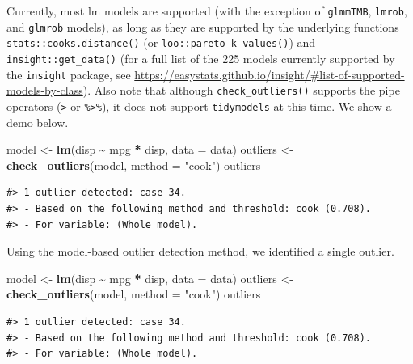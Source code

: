 \documentclass{article}
\newenvironment{Shaded}{\begin{snugshade}}{\end{snugshade}}
\newcommand{\AttributeTok}[1]{\textcolor[rgb]{0.13,0.29,0.53}{#1}}
\newcommand{\FunctionTok}[1]{\textcolor[rgb]{0.13,0.29,0.53}{\textbf{#1}}}
\newcommand{\NormalTok}[1]{#1}
\newcommand{\OtherTok}[1]{\textcolor[rgb]{0.56,0.35,0.01}{#1}}
\newcommand{\SpecialCharTok}[1]{\textcolor[rgb]{0.81,0.36,0.00}{\textbf{#1}}}
\newcommand{\StringTok}[1]{\textcolor[rgb]{0.31,0.60,0.02}{#1}}
\begin{document}
Currently, most lm models are supported (with the exception of
\texttt{glmmTMB}, \texttt{lmrob}, and \texttt{glmrob} models), as long
as they are supported by the underlying functions
\texttt{stats::cooks.distance()} (or \texttt{loo::pareto\_k\_values()})
and \texttt{insight::get\_data()} (for a full list of the 225 models
currently supported by the \texttt{insight} package, see
\url{https://easystats.github.io/insight/\#list-of-supported-models-by-class}).
Also note that although \texttt{check\_outliers()} supports the pipe
operators (\texttt{\textbar{}\textgreater{}} or
\texttt{\%\textgreater{}\%}), it does not support \texttt{tidymodels} at
this time. We show a demo below.

\begin{Shaded}
\begin{Highlighting}[]
\NormalTok{model }\OtherTok{\textless{}{-}} \FunctionTok{lm}\NormalTok{(disp }\SpecialCharTok{\textasciitilde{}}\NormalTok{ mpg }\SpecialCharTok{*}\NormalTok{ disp, }\AttributeTok{data =}\NormalTok{ data)}
\NormalTok{outliers }\OtherTok{\textless{}{-}} \FunctionTok{check\_outliers}\NormalTok{(model, }\AttributeTok{method =} \StringTok{"cook"}\NormalTok{)}
\NormalTok{outliers}
\end{Highlighting}
\end{Shaded}

\begin{verbatim}
#> 1 outlier detected: case 34.
#> - Based on the following method and threshold: cook (0.708).
#> - For variable: (Whole model).
\end{verbatim}

Using the model-based outlier detection method, we identified a single
outlier.

\begin{Shaded}
\begin{Highlighting}[]
\NormalTok{model }\OtherTok{\textless{}{-}} \FunctionTok{lm}\NormalTok{(disp }\SpecialCharTok{\textasciitilde{}}\NormalTok{ mpg }\SpecialCharTok{*}\NormalTok{ disp, }\AttributeTok{data =}\NormalTok{ data)}
\NormalTok{outliers }\OtherTok{\textless{}{-}} \FunctionTok{check\_outliers}\NormalTok{(model, }\AttributeTok{method =} \StringTok{"cook"}\NormalTok{)}
\NormalTok{outliers}
\end{Highlighting}
\end{Shaded}

\begin{verbatim}
#> 1 outlier detected: case 34.
#> - Based on the following method and threshold: cook (0.708).
#> - For variable: (Whole model).
\end{verbatim}
\end{document}
